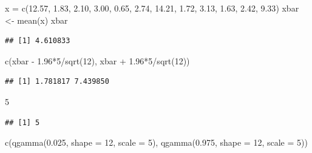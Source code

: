 \documentclass[
]{book}
\newenvironment{Shaded}{\begin{snugshade}}{\end{snugshade}}
\newcommand{\AttributeTok}[1]{\textcolor[rgb]{0.77,0.63,0.00}{#1}}
\newcommand{\DecValTok}[1]{\textcolor[rgb]{0.00,0.00,0.81}{#1}}
\newcommand{\FloatTok}[1]{\textcolor[rgb]{0.00,0.00,0.81}{#1}}
\newcommand{\FunctionTok}[1]{\textcolor[rgb]{0.00,0.00,0.00}{#1}}
\newcommand{\NormalTok}[1]{#1}
\newcommand{\OtherTok}[1]{\textcolor[rgb]{0.56,0.35,0.01}{#1}}
\newcommand{\SpecialCharTok}[1]{\textcolor[rgb]{0.00,0.00,0.00}{#1}}
\begin{document}
\begin{Shaded}
\begin{Highlighting}[]
\NormalTok{x }\OtherTok{=} \FunctionTok{c}\NormalTok{(}\FloatTok{12.57}\NormalTok{,  }\FloatTok{1.83}\NormalTok{,  }\FloatTok{2.10}\NormalTok{,  }\FloatTok{3.00}\NormalTok{,  }\FloatTok{0.65}\NormalTok{,  }\FloatTok{2.74}\NormalTok{, }\FloatTok{14.21}\NormalTok{,  }\FloatTok{1.72}\NormalTok{,  }\FloatTok{3.13}\NormalTok{,  }\FloatTok{1.63}\NormalTok{,  }\FloatTok{2.42}\NormalTok{,  }\FloatTok{9.33}\NormalTok{)}
\NormalTok{xbar }\OtherTok{\textless{}{-}} \FunctionTok{mean}\NormalTok{(x)}
\NormalTok{xbar}
\end{Highlighting}
\end{Shaded}

\begin{verbatim}
## [1] 4.610833
\end{verbatim}

\begin{Shaded}
\begin{Highlighting}[]
\FunctionTok{c}\NormalTok{(xbar }\SpecialCharTok{{-}} \FloatTok{1.96}\SpecialCharTok{*}\DecValTok{5}\SpecialCharTok{/}\FunctionTok{sqrt}\NormalTok{(}\DecValTok{12}\NormalTok{), xbar }\SpecialCharTok{+} \FloatTok{1.96}\SpecialCharTok{*}\DecValTok{5}\SpecialCharTok{/}\FunctionTok{sqrt}\NormalTok{(}\DecValTok{12}\NormalTok{))}
\end{Highlighting}
\end{Shaded}

\begin{verbatim}
## [1] 1.781817 7.439850
\end{verbatim}

\begin{Shaded}
\begin{Highlighting}[]
\DecValTok{5}
\end{Highlighting}
\end{Shaded}

\begin{verbatim}
## [1] 5
\end{verbatim}

\begin{Shaded}
\begin{Highlighting}[]
\FunctionTok{c}\NormalTok{(}\FunctionTok{qgamma}\NormalTok{(}\FloatTok{0.025}\NormalTok{, }\AttributeTok{shape =} \DecValTok{12}\NormalTok{, }\AttributeTok{scale =} \DecValTok{5}\NormalTok{), }\FunctionTok{qgamma}\NormalTok{(}\FloatTok{0.975}\NormalTok{, }\AttributeTok{shape =} \DecValTok{12}\NormalTok{, }\AttributeTok{scale =} \DecValTok{5}\NormalTok{))}
\end{Highlighting}
\end{Shaded}
\end{document}
